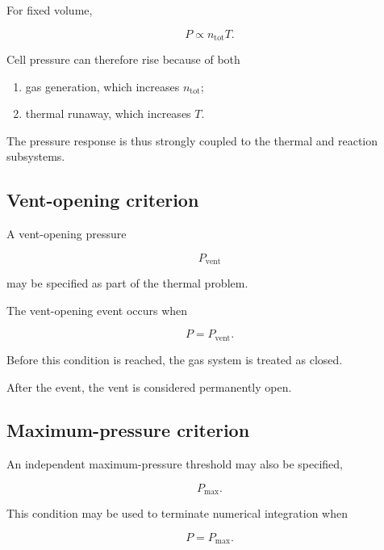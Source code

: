 For fixed volume,

\begin{equation}
    P
    \propto
    n_{\mathrm{tot}} T.
\end{equation}

Cell pressure can therefore rise because of both

\begin{enumerate}
    \item gas generation, which increases $n_{\mathrm{tot}}$;
    \item thermal runaway, which increases $T$.
\end{enumerate}

The pressure response is thus strongly coupled to the thermal and
reaction subsystems.


\subsection{Vent-opening criterion}

A vent-opening pressure

\begin{equation}
    P_{\mathrm{vent}}
\end{equation}

may be specified as part of the thermal problem.

The vent-opening event occurs when

\begin{equation}
    P
    =
    P_{\mathrm{vent}}.
    \label{eq:vent_open_condition}
\end{equation}

Before this condition is reached, the gas system is treated as closed.

After the event, the vent is considered permanently open.


\subsection{Maximum-pressure criterion}

An independent maximum-pressure threshold may also be specified,

\begin{equation}
    P_{\max}.
\end{equation}

This condition may be used to terminate numerical integration when

\begin{equation}
    P
    =
    P_{\max}.
    \label{eq:max_pressure_condition}
\end{equation}


